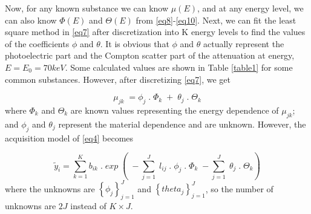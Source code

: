 Now, for any known substance we can know $\mu(E)$, and at any energy level, we can also know $\Phi(E)$ and $\Theta(E)$ from \ref{eq8}-\ref{eq10}. Next, we can fit the least square method in \ref{eq7} after discretization into K energy levels to find the values of the coefficients $\phi$ and $\theta$. It is obvious that $\phi$ and $\theta$ actually represent the photoelectric part and the Compton scatter part of the attenuation at energy, $E = E_{0} = 70 keV$. Some calculated values are shown in Table \ref{table1} for some common substances. However, after discretizing \ref{eq7}, we get 

\begin{equation}
\label{eq11}
\mu_{jk} \; = \phi_{j} \; . \; \Phi_{k} \; + \; \theta_{j} \; . \; \Theta_{k}
\end{equation} where $\Phi_k$ and $\Theta_k$ are known values representing the energy dependence of $\mu_{jk}$; and $\phi_j$ and $\theta_j$ represent the material dependence and are unknown. However, the acquisition model of \ref{eq4} becomes 

\begin{equation}
\label{eq12}
\widetilde{y}_{i} = \sum\limits_{k=1}^K  b_{ik} \; . \; exp \; \left( \; -\sum\limits_{j=1}^J \; l_{ij} \; . \; \phi_{j} \; . \; \Phi_{k} \;  -\sum\limits_{j=1}^J \; \theta_{j} \; . \; \Theta_{k} \right)
\end{equation} where the unknowns are $\left \{\phi_{j} \right \}_{j=1}^{J}$ and $\left \{theta_{j} \right \}_{j=1}^{J}$, so the number of unknowns are $2J$ instead of $K \times J$.

